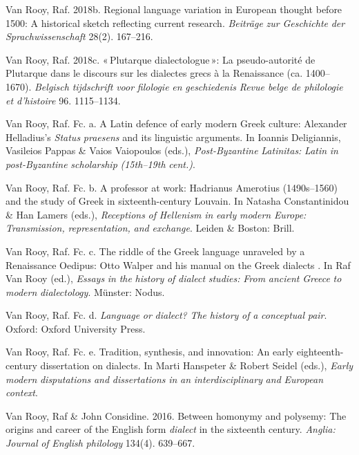 \documentclass[output=paper]{langsci/langscibook}
\begin{document}
Van Rooy, Raf. 2018b. Regional language variation in European thought before 1500: A historical sketch reflecting current research. \textit{Beiträge} \textit{zur} \textit{Geschichte} \textit{der} \textit{Sprachwissenschaft} 28(2). 167–216.

Van Rooy, Raf. 2018c. « Plutarque dialectologue »: La pseudo-autorité de Plutarque dans le discours sur les dialectes grecs à la Renaissance (ca. 1400–1670). \textit{Belgisch} \textit{tijdschrift} \textit{voor} \textit{filologie} \textit{en} \textit{geschiedenis} \textit{{\textbar} Revue belge de philologie et d’histoire} 96. 1115–1134.

Van Rooy, Raf. Fc. a. A Latin defence of early modern Greek culture: Alexander Helladius’s \textit{Status} \textit{praesens}  and its linguistic arguments. In Ioannis Deligiannis, Vasileios Pappas \& Vaios Vaiopoulos (eds.), \textit{Post-Byzantine} \textit{Latinitas:} \textit{Latin} \textit{in} \textit{post-Byzantine} \textit{scholarship} \textit{(15th–19th} \textit{cent.)}.

Van Rooy, Raf. Fc. b. A professor at work: Hadrianus Amerotius (1490s–1560) and the study of Greek in sixteenth-century Louvain. In Natasha Constantinidou \& Han Lamers (eds.), \textit{Receptions} \textit{of} \textit{Hellenism} \textit{in} \textit{early} \textit{modern} \textit{Europe:} \textit{Transmission,} \textit{representation,} \textit{and} \textit{exchange}. Leiden \& Boston: Brill.

Van Rooy, Raf. Fc. c. The riddle of the Greek language unraveled by a Renaissance Oedipus: Otto Walper and his manual on the Greek dialects . In Raf Van Rooy (ed.), \textit{Essays} \textit{in} \textit{the} \textit{history} \textit{of} \textit{dialect} \textit{studies:} \textit{From} \textit{ancient} \textit{Greece} \textit{to} \textit{modern} \textit{dialectology}. Münster: Nodus.

Van Rooy, Raf. Fc. d. \textit{Language} \textit{or} \textit{dialect?} \textit{The} \textit{history} \textit{of} \textit{a} \textit{conceptual} \textit{pair}. Oxford: Oxford University Press.

Van Rooy, Raf. Fc. e. Tradition, synthesis, and innovation: An early eighteenth-century dissertation on dialects. In Marti Hanspeter \& Robert Seidel (eds.), \textit{Early} \textit{modern} \textit{disputations} \textit{and} \textit{dissertations} \textit{in} \textit{an} \textit{interdisciplinary} \textit{and} \textit{European} \textit{context}.

Van Rooy, Raf \& John Considine. 2016. Between homonymy and polysemy: The origins and career of the English form \textit{dialect} in the sixteenth century. \textit{Anglia:} \textit{Journal} \textit{of} \textit{English} \textit{philology} 134(4). 639–667.
\end{document}
